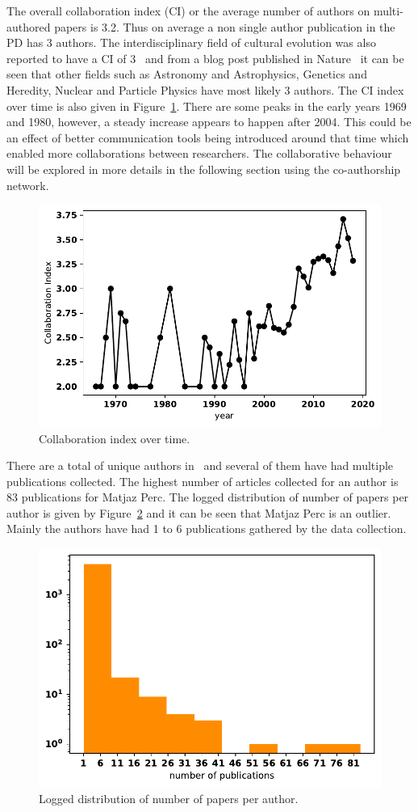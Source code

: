 \documentclass{article}
\theoremstyle{definition}
\newcommand{\authors}{}
\begin{document}
The overall collaboration index (CI) or the average number of authors on
multi-authored papers is 3.2. Thus on average a non single author publication in
the PD has 3 authors. The interdisciplinary field of cultural evolution was also
reported to have a CI of 3~\cite{youngblood2018} and from a blog post published
in Nature~\cite{nature_author_blog} it can be seen that other fields such as
Astronomy and Astrophysics, Genetics and Heredity, Nuclear and Particle Physics
have most likely 3 authors. The CI index over time is also given in
Figure~\ref{fig:ci_over_time}. There are some peaks in the early years 1969 and
1980, however, a steady increase appears to happen after 2004. This could
be an effect of better communication tools being introduced around that time
which enabled more collaborations between researchers. The collaborative
behaviour will be explored in more details in the following section using the
co-authorship network.

\begin{figure}[!hbtp]
    \centering
    \includegraphics[width=.5\textwidth]{./assets/images/collaborative_index.pdf}
    \caption{Collaboration index over time.}\label{fig:ci_over_time}
\end{figure}

There are a total of \authors unique authors in~\cite{pd_data_2018} and several of them
have had multiple publications collected. The highest number of articles
collected for an author is 83 publications for Matjaz Perc. The logged
distribution of number of papers per author is given by
Figure~\ref{fig:num_papers_per_author} and it can be seen that Matjaz Perc is an
outlier. Mainly the authors have had 1 to 6 publications gathered by the data
collection.

\begin{figure}[!hbtp]
    \centering
    \includegraphics[width=.5\textwidth]{./assets/images/papers_per_author.pdf}
    \caption{Logged distribution of number of papers per author.}
    \label{fig:num_papers_per_author}
\end{figure}
\end{document}

